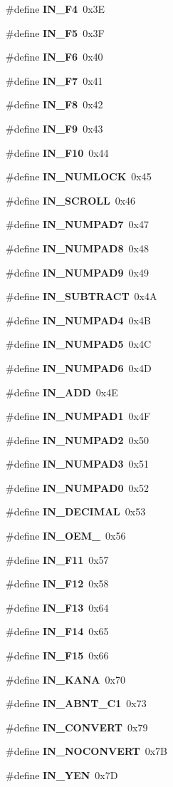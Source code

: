 \begin{CompactItemize}
\#define {\bf IN\_\-F4}~0x3E
\item 
\#define {\bf IN\_\-F5}~0x3F
\item 
\#define {\bf IN\_\-F6}~0x40
\item 
\#define {\bf IN\_\-F7}~0x41
\item 
\#define {\bf IN\_\-F8}~0x42
\item 
\#define {\bf IN\_\-F9}~0x43
\item 
\#define {\bf IN\_\-F10}~0x44
\item 
\#define {\bf IN\_\-NUMLOCK}~0x45
\item 
\#define {\bf IN\_\-SCROLL}~0x46
\item 
\#define {\bf IN\_\-NUMPAD7}~0x47
\item 
\#define {\bf IN\_\-NUMPAD8}~0x48
\item 
\#define {\bf IN\_\-NUMPAD9}~0x49
\item 
\#define {\bf IN\_\-SUBTRACT}~0x4A
\item 
\#define {\bf IN\_\-NUMPAD4}~0x4B
\item 
\#define {\bf IN\_\-NUMPAD5}~0x4C
\item 
\#define {\bf IN\_\-NUMPAD6}~0x4D
\item 
\#define {\bf IN\_\-ADD}~0x4E
\item 
\#define {\bf IN\_\-NUMPAD1}~0x4F
\item 
\#define {\bf IN\_\-NUMPAD2}~0x50
\item 
\#define {\bf IN\_\-NUMPAD3}~0x51
\item 
\#define {\bf IN\_\-NUMPAD0}~0x52
\item 
\#define {\bf IN\_\-DECIMAL}~0x53
\item 
\#define {\bf IN\_\-OEM\_}~0x56
\item 
\#define {\bf IN\_\-F11}~0x57
\item 
\#define {\bf IN\_\-F12}~0x58
\item 
\#define {\bf IN\_\-F13}~0x64
\item 
\#define {\bf IN\_\-F14}~0x65
\item 
\#define {\bf IN\_\-F15}~0x66
\item 
\#define {\bf IN\_\-KANA}~0x70
\item 
\#define {\bf IN\_\-ABNT\_\-C1}~0x73
\item 
\#define {\bf IN\_\-CONVERT}~0x79
\item 
\#define {\bf IN\_\-NOCONVERT}~0x7B
\item 
\#define {\bf IN\_\-YEN}~0x7D
\item 

\end{CompactItemize}
